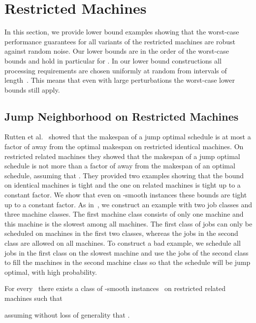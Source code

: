 \documentclass[a4paper,11pt,fleqn]{article}
\begin{document}
\section{Restricted Machines}
\label{sec:restricted}

In this section, we provide lower bound examples showing that the
worst-case performance guarantees for all variants of the restricted
machines are robust against random noise. Our lower bounds are in the
order of the worst-case bounds and hold in particular
for . In our lower bound constructions all processing
requirements are chosen uniformly at random from intervals of length~.
This means that even with large perturbations the worst-case
lower bounds still apply.

\subsection{Jump Neighborhood on Restricted Machines}
\label{subsec:lb-jump-restricted}

Rutten et al.~\cite{Rutten:etal:2012} showed that the makespan of a
jump optimal schedule is at most a factor of  away from
the optimal makespan on restricted identical machines. 
On restricted related machines they
showed that the makespan of a jump optimal
schedule is not more than a factor of 
away from the makespan of an optimal schedule, assuming that .
They provided two examples showing that the bound on identical machines
is tight and the one on related machines is tight up to a constant
factor.
We show that even on -smooth
instances these bounds are tight up to a constant factor.
As in~\cite{Rutten:etal:2012}, we construct an example with two job
classes and three machine classes. The first machine class consists of
only one machine and this machine is the slowest among all machines. The
first class of jobs can only be scheduled on machines in the first two
classes, whereas the jobs in the second class are allowed on all
machines. To construct a bad example, we schedule all jobs in the first
class on the slowest machine and use the jobs of the second class to
fill the machines in the second machine class so that the schedule will
be jump optimal, with high probability. 

\begin{theorem}\label{thm:RestrictedJump}
For every~ there exists a class of -smooth instances~ on
restricted related machines such that

assuming without loss of generality that .
\end{theorem}
\end{document}
